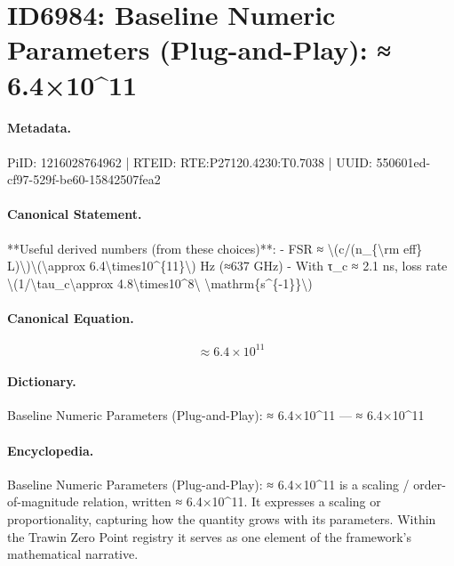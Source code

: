 \section*{ID6984: Baseline Numeric Parameters (Plug-and-Play): ≈ 6.4×10\textasciicircum{}11}
\paragraph{Metadata.}
PiID: 1216028764962 | RTEID: RTE:P27120.4230:T0.7038 | UUID: 550601ed-cf97-529f-be60-15842507fea2

\paragraph{Canonical Statement.}
**Useful derived numbers (from these choices)**: - FSR ≈ \textbackslash{}(c/(n\_\{\textbackslash{}rm eff\} L)\textbackslash{})\textbackslash{}(\textbackslash{}approx 6.4\textbackslash{}times10\textasciicircum{}\{11\}\textbackslash{}) Hz (≈637 GHz) - With τ\_c ≈ 2.1 ns, loss rate \textbackslash{}(1/\textbackslash{}tau\_c\textbackslash{}approx 4.8\textbackslash{}times10\textasciicircum{}8\textbackslash{} \textbackslash{}mathrm\{s\textasciicircum{}\{-1\}\}\textbackslash{})

\paragraph{Canonical Equation.}
\[
\approx 6.4\times10^{11}
\]

\paragraph{Dictionary.}
Baseline Numeric Parameters (Plug-and-Play): ≈ 6.4×10\textasciicircum{}11 — ≈ 6.4×10\textasciicircum{}11

\paragraph{Encyclopedia.}
Baseline Numeric Parameters (Plug-and-Play): ≈ 6.4×10\textasciicircum{}11 is a scaling / order-of-magnitude relation, written ≈ 6.4×10\textasciicircum{}11. It expresses a scaling or proportionality, capturing how the quantity grows with its parameters. Within the Trawin Zero Point registry it serves as one element of the framework's mathematical narrative.
